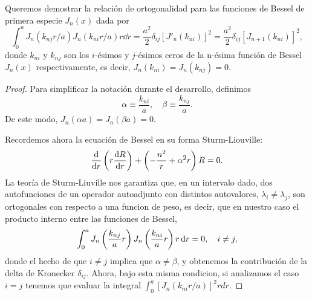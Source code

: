 \documentclass[11pt]{article}
\theoremstyle{definition}
\numberwithin{equation}{section}
\begin{document}
Queremos demostrar la relación de ortogonalidad para las funciones de Bessel de primera especie $J_n(x)$ dada por
\begin{equation}
	\int_0^a J_n(k_{nj}r/a)J_n(k_{ni}r/a)r\dd{r}= \frac{a^2}{2}\delta_{ij} [J'_n(k_{ni})]^2 = \frac{a^2}{2}\delta_{ij}[J_{n+1}(k_{ni})]^2,
\end{equation}
donde $k_{ni}$ y $k_{nj}$ son los $i$-ésimos y $j$-ésimos ceros de la n-ésima función de Bessel $J_n(x)$  respectivamente, es decir, $J_n(k_{ni}) = J_n(k_{nj}) = 0$.
\begin{proof}
	Para simplificar la notación durante el desarrollo, definimos
	\begin{equation}
		\alpha \equiv \frac{k_{ni}}{a}, \quad \beta \equiv \frac{k_{nj}}{a}.
	\end{equation}
	De este modo, $J_n(\alpha a) = J_n(\beta a) = 0$.

	Recordemos ahora la ecuación de Bessel en su forma Sturm-Liouville:
	\begin{equation}
		\dv{r}\left( r \dv{R}{r} \right) + \left( -\frac{n^2}{r} + \alpha^2 r \right) R = 0.
	\end{equation}
	La teoría de Sturm-Liuville nos garantiza que, en un intervalo dado, dos autofunciones de un operador autoadjunto con distintos autovalores, $\lambda_i \neq \lambda_j$, son ortogonales con respecto a una funcion de peso, es decir, que en nuestro caso el producto interno entre las funciones de Bessel,
	\begin{equation}
		\int_0^a J_n\left(\frac{k_{nj}}{a}r\right)J_n\left(\frac{k_{ni}}{a}r\right)r\dd{r} = 0 \qc i\neq j,
	\end{equation}
	donde el hecho de que $i\neq j$ implica que $\alpha\neq\beta$, y obtenemos la contribución de la delta de Kronecker $\delta_{ij}$. Ahora, bajo esta misma condicion, si analizamos el caso $i=j$ tenemos que evaluar la integral $\int_0^a [J_n(k_{ni}r/a)]^2 rdr$.


\end{proof}
\end{document}
